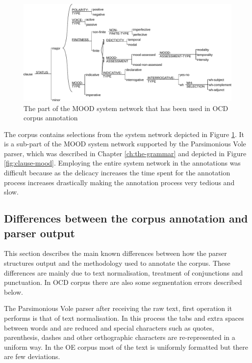     \begin{figure}[!h]
        \centering
        \includegraphics[width=.85\textwidth]{Figures/Evaluation/ocd1-mood-simplified.pdf}
        \caption{The part of the MOOD system network that has been used in OCD corpus annotation}
        \label{fig:mood-ocd-simplified}
    \end{figure}
    
    The corpus contains selections from the system network depicted in Figure \ref{fig:mood-ocd-simplified}. It is a sub-part of the MOOD system network supported by the Parsimonious Vole parser, which was described in Chapter \ref{ch:the-grammar} and depicted in Figure \ref{fig:clause-mood}. Employing the entire system network in the annotations was difficult because as the delicacy increases the time spent for the annotation process increases drastically making the annotation process very tedious and slow.
    


\subsection{Differences between the corpus annotation and parser output}
\label{sec:differences}

    This section describes the main known differences between how the parser structures output and the methodology used to annotate the corpus. These differences are mainly due to text normalisation, treatment of conjunctions and punctuation. In OCD corpus there are also some segmentation errors described below.
    
    The Parsimonious Vole parser after receiving the raw text, first operation it performs is that of text normalisation. In this process the tabs and extra spaces between words and are reduced and special characters such as quotes, parenthesis, dashes and other orthographic characters are re-represented in a uniform way. In the OE corpus most of the text is uniformly formatted but there are few deviations. 
    

